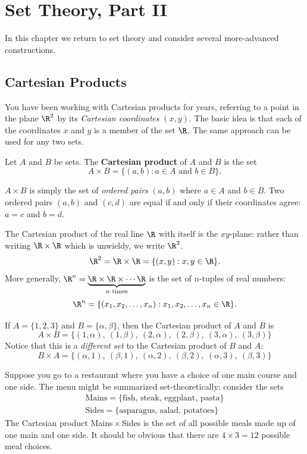 \graphicspath{{notes/6setsii/}}

\section{Set Theory, Part II}

In this chapter we return to set theory and consider several more-advanced constructions.

\subsection{Cartesian Products}

You have been working with Cartesian products for years, referring to a point in the plane $\R^2$ by its \emph{Cartesian coordinates} $(x,y)$. The basic idea is that each of the coordinates $x$ and $y$ is a member of the set $\R$. The same approach can be used for any two sets.

\begin{defn}
Let $A$ and $B$ be sets. The \textbf{Cartesian product} of $A$ and $B$ is the set
\[A\times B=\{(a,b):a\in A\text{ and }b\in B\}.\]
\end{defn}

\noindent $A\times B$ is simply the set of \emph{ordered pairs} $(a,b)$ where $a\in A$ and $b\in B$. Two ordered pairs $(a,b)$ and $(c,d)$ are equal if and only if their coordinates agree: $a = c$ and $b = d$.

\begin{examples}
	\item The Cartesian product of the real line $\R$ with itself is the $xy$-plane: rather than writing $\R\times\R$ which is unwieldy, we write $\R^2$.
	\[\R^2=\R\times\R=\{(x,y):x,y\in\R\}.\]
	More generally, $\R^n=\underbrace{\R\times\R\times\cdots\R}_{\text{$n$ times}}$ is the set of $n$-tuples of real numbers:
	\[\R^n=\{(x_1,x_2,\ldots,x_n):x_1,x_2,\ldots,x_n\in\R\}.\]
	\item If $A=\{1,2,3\}$ and $B=\{\alpha,\beta\}$, then the Cartesian product of $A$ and $B$ is
	\[A\times B=\{(1,\alpha),\ (1,\beta),\ (2,\alpha),\ (2,\beta),\ (3,\alpha),\ (3,\beta)\}\]
	Notice that this is a \emph{different set} to the Cartesian product of $B$ and $A$:
	\[B\times A=\{(\alpha,1),\ (\beta,1),\ (\alpha,2),\ (\beta,2),\ (\alpha,3),\ (\beta,3)\}\]
	\item Suppose you go to a restaurant where you have a choice of one main course and one side. The menu might be summarized set-theoretically: consider the sets
	\begin{gather*}
	\text{Mains}=\{\text{fish, steak, eggplant, pasta}\}\\
	\text{Sides}=\{\text{asparagus, salad, potatoes}\}
	\end{gather*}
	The Cartesian product Mains\,$\times$\,Sides is the set of all possible meals made up of one main and one side. It should be obvious that there are $4\times 3=12$ possible meal choices.
\end{examples}

